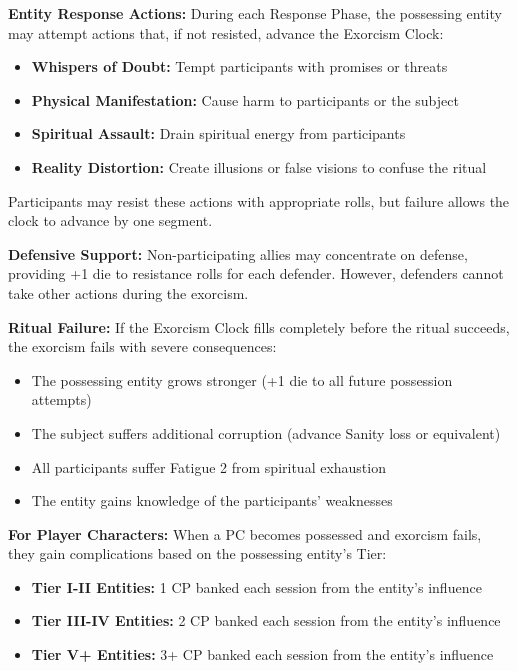 \documentclass[12pt,twoside]{book}
\begin{document}
\textbf{Entity Response Actions:}
During each Response Phase, the possessing entity may attempt actions that, if not resisted, advance the Exorcism Clock:
\begin{itemize}
\item \textbf{Whispers of Doubt:} Tempt participants with promises or threats
\item \textbf{Physical Manifestation:} Cause harm to participants or the subject
\item \textbf{Spiritual Assault:} Drain spiritual energy from participants
\item \textbf{Reality Distortion:} Create illusions or false visions to confuse the ritual
\end{itemize}

Participants may resist these actions with appropriate rolls, but failure allows the clock to advance by one segment.

\textbf{Defensive Support:}
Non-participating allies may concentrate on defense, providing +1 die to resistance rolls for each defender. However, defenders cannot take other actions during the exorcism.

\textbf{Ritual Failure:}
If the Exorcism Clock fills completely before the ritual succeeds, the exorcism fails with severe consequences:
\begin{itemize}
\item The possessing entity grows stronger (+1 die to all future possession attempts)
\item The subject suffers additional corruption (advance Sanity loss or equivalent)
\item All participants suffer Fatigue 2 from spiritual exhaustion
\item The entity gains knowledge of the participants' weaknesses
\end{itemize}

\textbf{For Player Characters:}
When a PC becomes possessed and exorcism fails, they gain complications based on the possessing entity's Tier:
\begin{itemize}
\item \textbf{Tier I-II Entities:} 1 CP banked each session from the entity's influence
\item \textbf{Tier III-IV Entities:} 2 CP banked each session from the entity's influence  
\item \textbf{Tier V+ Entities:} 3+ CP banked each session from the entity's influence
\end{itemize}
\end{document}
